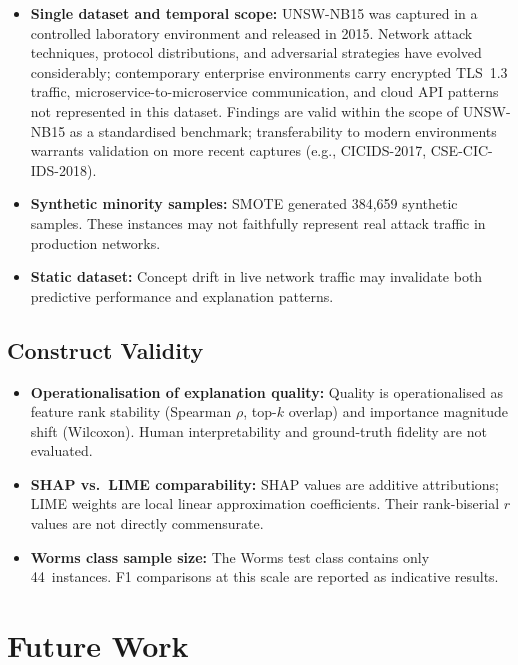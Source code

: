\documentclass[conference,a4paper]{IEEEtran}
\newcommand{\SMOTE}{SMOTE\xspace}
\begin{document}
\begin{itemize}
  \item \textbf{Single dataset and temporal scope:} UNSW-NB15 was captured in a
        controlled laboratory environment and released in 2015. Network attack
        techniques, protocol distributions, and adversarial strategies have evolved
        considerably; contemporary enterprise environments carry encrypted TLS~1.3
        traffic, microservice-to-microservice communication, and cloud API patterns
        not represented in this dataset. Findings are valid within the scope of
        UNSW-NB15 as a standardised benchmark; transferability to modern
        environments warrants validation on more recent captures (e.g.,
        CICIDS-2017, CSE-CIC-IDS-2018).
  \item \textbf{Synthetic minority samples:} \SMOTE generated 384,659 synthetic
        samples. These instances may not faithfully represent real attack traffic
        in production networks.
  \item \textbf{Static dataset:} Concept drift in live network traffic may
        invalidate both predictive performance and explanation patterns.
\end{itemize}

\subsection{Construct Validity}

\begin{itemize}
  \item \textbf{Operationalisation of explanation quality:} Quality is
        operationalised as feature rank stability (Spearman $\rho$, top-$k$
        overlap) and importance magnitude shift (Wilcoxon). Human interpretability
        and ground-truth fidelity are not evaluated.
  \item \textbf{SHAP vs.\ LIME comparability:} SHAP values are additive
        attributions; LIME weights are local linear approximation coefficients.
        Their rank-biserial $r$ values are not directly commensurate.
  \item \textbf{Worms class sample size:} The Worms test class contains only
        44~instances. F1 comparisons at this scale are reported as indicative
        results.
\end{itemize}

\section{Future Work}
\label{sec:future}
\end{document}
